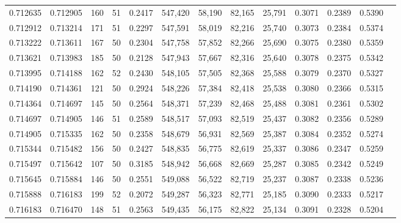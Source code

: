 \begin{tabular}{rrrrrrrrrrrrr}
0.712635 & 0.712905 &   160 &  51 &                                     0.2417 & 547,420 &  58,190 &  82,165 &  25,791 & 0.3071 & 0.2389 & 0.5390 \\
0.712912 & 0.713214 &   171 &  51 &                                     0.2297 & 547,591 &  58,019 &  82,216 &  25,740 & 0.3073 & 0.2384 & 0.5374 \\
0.713222 & 0.713611 &   167 &  50 &                                     0.2304 & 547,758 &  57,852 &  82,266 &  25,690 & 0.3075 & 0.2380 & 0.5359 \\
0.713621 & 0.713983 &   185 &  50 &                                     0.2128 & 547,943 &  57,667 &  82,316 &  25,640 & 0.3078 & 0.2375 & 0.5342 \\
0.713995 & 0.714188 &   162 &  52 &                                     0.2430 & 548,105 &  57,505 &  82,368 &  25,588 & 0.3079 & 0.2370 & 0.5327 \\
0.714190 & 0.714361 &   121 &  50 &                                     0.2924 & 548,226 &  57,384 &  82,418 &  25,538 & 0.3080 & 0.2366 & 0.5315 \\
0.714364 & 0.714697 &   145 &  50 &                                     0.2564 & 548,371 &  57,239 &  82,468 &  25,488 & 0.3081 & 0.2361 & 0.5302 \\
0.714697 & 0.714905 &   146 &  51 &                                     0.2589 & 548,517 &  57,093 &  82,519 &  25,437 & 0.3082 & 0.2356 & 0.5289 \\
0.714905 & 0.715335 &   162 &  50 &                                     0.2358 & 548,679 &  56,931 &  82,569 &  25,387 & 0.3084 & 0.2352 & 0.5274 \\
0.715344 & 0.715482 &   156 &  50 &                                     0.2427 & 548,835 &  56,775 &  82,619 &  25,337 & 0.3086 & 0.2347 & 0.5259 \\
0.715497 & 0.715642 &   107 &  50 &                                     0.3185 & 548,942 &  56,668 &  82,669 &  25,287 & 0.3085 & 0.2342 & 0.5249 \\
0.715645 & 0.715884 &   146 &  50 &                                     0.2551 & 549,088 &  56,522 &  82,719 &  25,237 & 0.3087 & 0.2338 & 0.5236 \\
0.715888 & 0.716183 &   199 &  52 &                                     0.2072 & 549,287 &  56,323 &  82,771 &  25,185 & 0.3090 & 0.2333 & 0.5217 \\
0.716183 & 0.716470 &   148 &  51 &                                     0.2563 & 549,435 &  56,175 &  82,822 &  25,134 & 0.3091 & 0.2328 & 0.5204 \\

\end{tabular}

